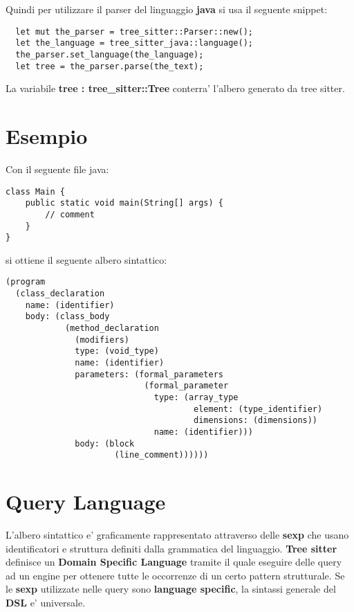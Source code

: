 Quindi per utilizzare il parser del linguaggio \textbf{java} si usa il seguente snippet:

\begin{verbatim}
  let mut the_parser = tree_sitter::Parser::new();
  let the_language = tree_sitter_java::language();
  the_parser.set_language(the_language);
  let tree = the_parser.parse(the_text);
\end{verbatim}

La variabile \textbf{tree : tree\_sitter::Tree} conterra' l'albero generato da tree sitter.


\section{Esempio}

Con il seguente file java:

\begin{verbatim}
class Main {
	public static void main(String[] args) {
    	// comment
    }
}
\end{verbatim}

si ottiene il seguente albero sintattico:

\begin{verbatim}
(program
  (class_declaration
    name: (identifier)
    body: (class_body
            (method_declaration
              (modifiers)
              type: (void_type)
              name: (identifier)
              parameters: (formal_parameters
                            (formal_parameter
                              type: (array_type
                                      element: (type_identifier)
                                      dimensions: (dimensions))
                              name: (identifier)))
              body: (block
                      (line_comment))))))
\end{verbatim}

\section{Query Language}

L'albero sintattico e' graficamente rappresentato attraverso delle \textbf{sexp} che usano identificatori e struttura definiti dalla grammatica del linguaggio.
\textbf{Tree sitter} definisce un \textbf{Domain Specific Language} \cite{TreeSitterQuerySyntax} tramite il quale eseguire delle query ad un engine per ottenere tutte le occorrenze di un certo pattern strutturale.
Se le \textbf{sexp} utilizzate nelle query sono \textbf{language specific},  la sintassi generale del \textbf{DSL} e' universale.

